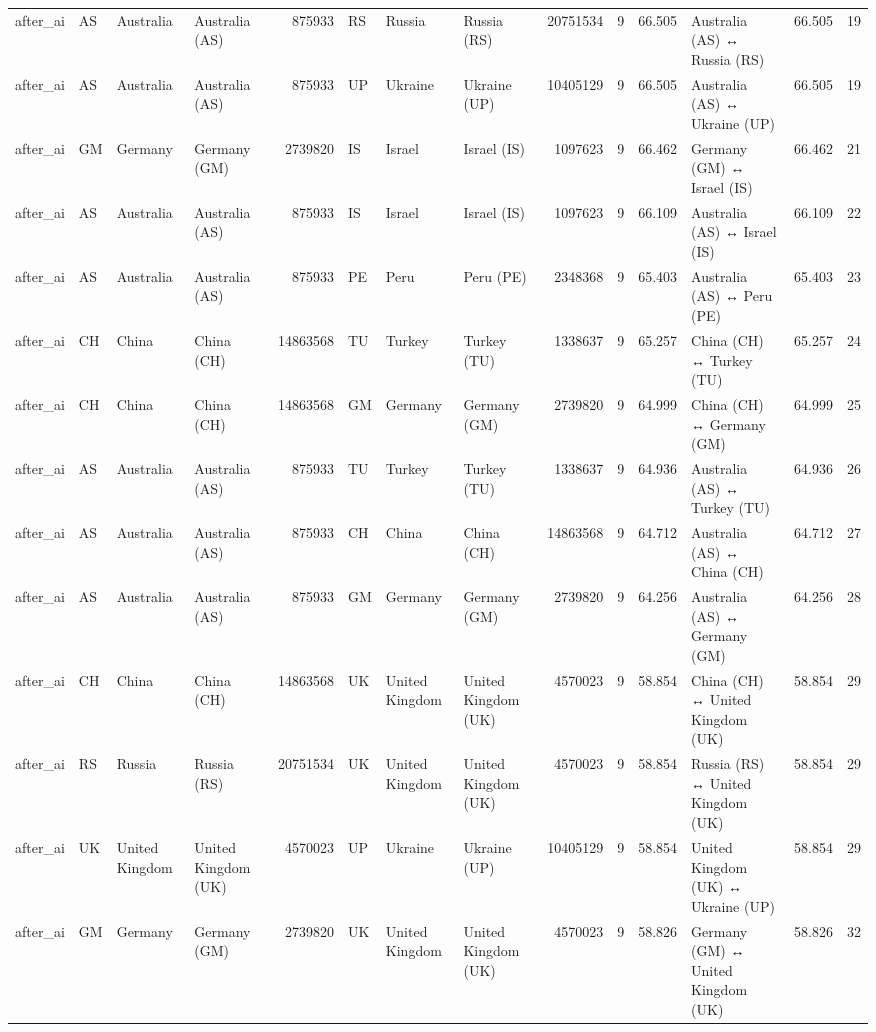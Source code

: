 \begin{tabular}{llllrlllrrrlrr}
after\_ai & AS & Australia & Australia (AS) & 875933 & RS & Russia & Russia (RS) & 20751534 & 9 & 66.505 & Australia (AS) ↔ Russia (RS) & 66.505 & 19 \\
after\_ai & AS & Australia & Australia (AS) & 875933 & UP & Ukraine & Ukraine (UP) & 10405129 & 9 & 66.505 & Australia (AS) ↔ Ukraine (UP) & 66.505 & 19 \\
after\_ai & GM & Germany & Germany (GM) & 2739820 & IS & Israel & Israel (IS) & 1097623 & 9 & 66.462 & Germany (GM) ↔ Israel (IS) & 66.462 & 21 \\
after\_ai & AS & Australia & Australia (AS) & 875933 & IS & Israel & Israel (IS) & 1097623 & 9 & 66.109 & Australia (AS) ↔ Israel (IS) & 66.109 & 22 \\
after\_ai & AS & Australia & Australia (AS) & 875933 & PE & Peru & Peru (PE) & 2348368 & 9 & 65.403 & Australia (AS) ↔ Peru (PE) & 65.403 & 23 \\
after\_ai & CH & China & China (CH) & 14863568 & TU & Turkey & Turkey (TU) & 1338637 & 9 & 65.257 & China (CH) ↔ Turkey (TU) & 65.257 & 24 \\
after\_ai & CH & China & China (CH) & 14863568 & GM & Germany & Germany (GM) & 2739820 & 9 & 64.999 & China (CH) ↔ Germany (GM) & 64.999 & 25 \\
after\_ai & AS & Australia & Australia (AS) & 875933 & TU & Turkey & Turkey (TU) & 1338637 & 9 & 64.936 & Australia (AS) ↔ Turkey (TU) & 64.936 & 26 \\
after\_ai & AS & Australia & Australia (AS) & 875933 & CH & China & China (CH) & 14863568 & 9 & 64.712 & Australia (AS) ↔ China (CH) & 64.712 & 27 \\
after\_ai & AS & Australia & Australia (AS) & 875933 & GM & Germany & Germany (GM) & 2739820 & 9 & 64.256 & Australia (AS) ↔ Germany (GM) & 64.256 & 28 \\
after\_ai & CH & China & China (CH) & 14863568 & UK & United Kingdom & United Kingdom (UK) & 4570023 & 9 & 58.854 & China (CH) ↔ United Kingdom (UK) & 58.854 & 29 \\
after\_ai & RS & Russia & Russia (RS) & 20751534 & UK & United Kingdom & United Kingdom (UK) & 4570023 & 9 & 58.854 & Russia (RS) ↔ United Kingdom (UK) & 58.854 & 29 \\
after\_ai & UK & United Kingdom & United Kingdom (UK) & 4570023 & UP & Ukraine & Ukraine (UP) & 10405129 & 9 & 58.854 & United Kingdom (UK) ↔ Ukraine (UP) & 58.854 & 29 \\
after\_ai & GM & Germany & Germany (GM) & 2739820 & UK & United Kingdom & United Kingdom (UK) & 4570023 & 9 & 58.826 & Germany (GM) ↔ United Kingdom (UK) & 58.826 & 32 \\

\end{tabular}
